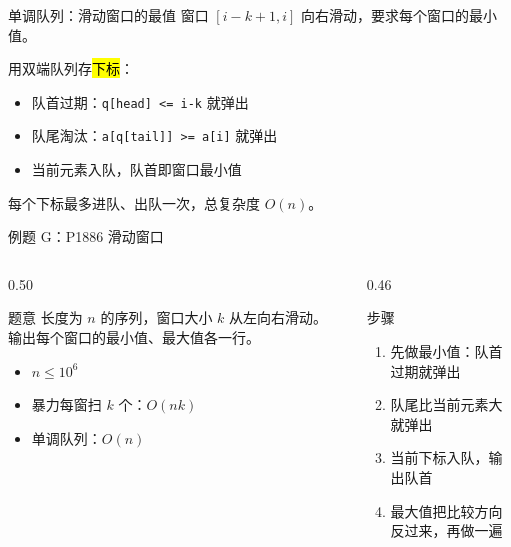 \documentclass[aspectratio=169]{beamer}
\begin{document}
\begin{frame}{单调队列：滑动窗口的最值}
    窗口 $[i-k+1,i]$ 向右滑动，要求每个窗口的最小值。

    \vspace{0.4em}
    用双端队列存\hl{下标}：
    \begin{itemize}
        \item 队首过期：\texttt{q[head] <= i-k} 就弹出
        \item 队尾淘汰：\texttt{a[q[tail]] >= a[i]} 就弹出
        \item 当前元素入队，队首即窗口最小值
    \end{itemize}
    \vspace{0.4em}
    每个下标最多进队、出队一次，总复杂度 $O(n)$。
\end{frame}

\begin{frame}{例题 G：P1886 滑动窗口}
    \begin{columns}[T]
        \begin{column}{0.50\textwidth}
            \small
            \begin{block}{题意}
                \footnotesize
                长度为 $n$ 的序列，窗口大小 $k$ 从左向右滑动。
                输出每个窗口的最小值、最大值各一行。
            \end{block}
            \begin{itemize}
                \item $n\le 10^6$
                \item 暴力每窗扫 $k$ 个：$O(nk)$
                \item 单调队列：$O(n)$
            \end{itemize}
        \end{column}
        \begin{column}{0.46\textwidth}
            \begin{block}{步骤}
                \footnotesize
                \begin{enumerate}
                    \item 先做最小值：队首过期就弹出
                    \item 队尾比当前元素大就弹出
                    \item 当前下标入队，输出队首
                    \item 最大值把比较方向反过来，再做一遍
                \end{enumerate}
            \end{block}
        \end{column}
    \end{columns}
\end{frame}
\end{document}
